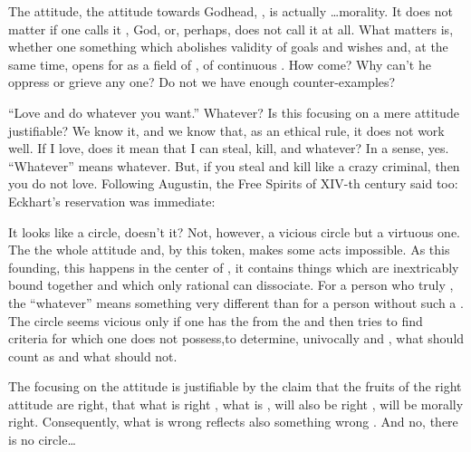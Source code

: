 \pa The  attitude, the attitude towards Godhead, 
, is actually \ldots  morality.  It does not matter if
one calls it , God,  or, perhaps, does not call it
at all.  What matters is, whether one  something 
which abolishes validity of   goals and wishes and,
at the same time, opens for   as a field of
, of continuous .
How come? Why can't he oppress or grieve any one? Do not we have 
enough counter-examples?

\pa ``Love and do whatever you want.'' Whatever? Is this focusing
on a mere attitude justifiable? We know it, and we know that, as an
ethical rule, it does not work well. If I love, does it mean that I
can steal, kill, and whatever?  In a sense, yes.  ``Whatever'' means
whatever.  But, if you steal and kill like a crazy criminal, then you
do not love.  Following Augustin, the Free Spirits of XIV-th century
said too:  Eckhart's reservation was
immediate: 

It looks like a circle, doesn't it?  Not, however, a
vicious circle but a virtuous one.   The   the whole
attitude and, by this token, makes some acts impossible.  As this
founding, this  happens in the  center
of , it contains things which are inextricably bound
together and which only rational  can dissociate.  For
a person who truly , the ``whatever'' means something very
different than for a person without such a .  The circle seems
vicious only if one has  the  from the 
 and then tries to find  criteria for  which
one does not possess,to determine, univocally and
, what should count as  and what should not.

\pa
The focusing on the attitude is justifiable by the claim that the 
fruits of the right attitude are right, that what is right 
, what is ,  
will also be right , will be morally right. 
Consequently, what is wrong 
 reflects also something wrong . 
And no, there is no circle\ldots

